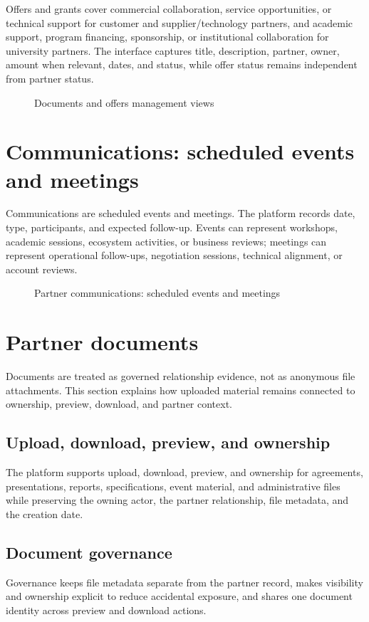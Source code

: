 Offers and grants cover commercial collaboration, service opportunities, or technical support for customer and supplier/technology partners, and academic support, program financing, sponsorship, or institutional collaboration for university partners. The interface captures title, description, partner, owner, amount when relevant, dates, and status, while offer status remains independent from partner status.

\begin{figure}[htbp]
  \centering
  \caption{Documents and offers management views}
\end{figure}

\section{Communications: scheduled events and meetings}

Communications are scheduled events and meetings. The platform records date, type, participants, and expected follow-up. Events can represent workshops, academic sessions, ecosystem activities, or business reviews; meetings can represent operational follow-ups, negotiation sessions, technical alignment, or account reviews.

\begin{figure}[htbp]
  \centering
  \caption{Partner communications: scheduled events and meetings}
\end{figure}

\section{Partner documents}
Documents are treated as governed relationship evidence, not as anonymous file attachments. This section explains how uploaded material remains connected to ownership, preview, download, and partner context.

\subsection{Upload, download, preview, and ownership}
The platform supports upload, download, preview, and ownership for agreements, presentations, reports, specifications, event material, and administrative files while preserving the owning actor, the partner relationship, file metadata, and the creation date.

\subsection{Document governance}
Governance keeps file metadata separate from the partner record, makes visibility and ownership explicit to reduce accidental exposure, and shares one document identity across preview and download actions.

